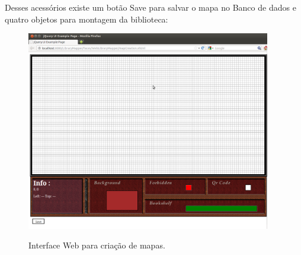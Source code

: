 \documentclass[a4paper,10pt]{article}
\begin{document}
	Desses acessórios existe um botão Save para salvar o mapa no Banco de dados e quatro objetos para montagem da biblioteca:
\begin{figure}[H]
	\centering
	\includegraphics[width=0.95\textwidth]{./imgs/mapCreation.png}\\[1cm]   
	\caption{Interface Web para criação de mapas.}
	\label{mapCreation}
\end{figure}	
\end{document}
